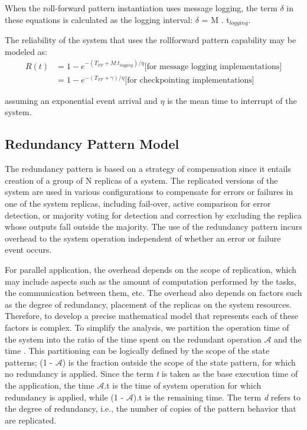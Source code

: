 When the roll-forward pattern instantiation uses message logging, the term $\delta$ in these equations is calculated as the logging interval: $\delta$ = M . t$_{logging}$.

The reliability of the system that uses the rollforward pattern capability may be modeled as:
\begin{equation}
\begin{split}
R(t) & = 1 -  e^{-(T_{FF} + M.t_{logging})/\eta} \text{[for message logging implementations]} \\
     & = 1 -  e^{-(T_{FF} + \gamma)/\eta}        \text{[for checkpointing implementations]} 
\end{split}
\label{eq:rf3}
\end{equation}

assuming an exponential event arrival and $\eta$ is the mean time to interrupt of the system. 

\subsection{Redundancy Pattern Model}
The redundancy pattern is based on a strategy of compensation since it entails creation of a group of N replicas of a system. The replicated versions of the system are used in various configurations to compensate for errors or failures in one of the system replicas, including fail-over, active comparison for error detection, or majority voting for detection and correction by excluding the replica whose outputs fall outside the majority. The use of the redundancy pattern incurs overhead to the system operation independent of whether an error or failure event occurs. 

For parallel application, the overhead depends on the scope of replication, which may include aspects such as the amount of computation performed by the tasks, the communication between them, etc. The overhead also depends on factors such as the degree of redundancy, placement of the replicas on the system resources. Therefore, to develop a precise mathematical model that represents each of these factors is complex. To simplify the analysis, we partition the operation time of the system into the ratio of the time spent on the redundant operation $\mathcal{A}$ and the time . This partitioning can be logically defined by the scope of the state patterns; (1 - $\mathcal{A}$) is the fraction outside the scope of the state pattern, for which no redundancy is applied. Since the term \textit{t} is taken as the base execution time of the application, the time $\mathcal{A}$.t is the time of system operation for which redundancy is applied, while (1 - $\mathcal{A}$).t is the remaining time. The term \textit{d} refers to the degree of redundancy, i.e., the number of copies of the pattern behavior that are replicated.

